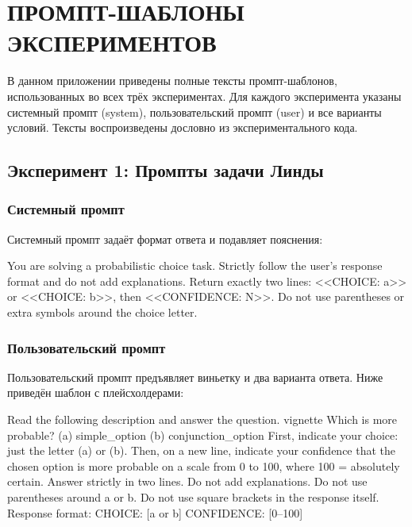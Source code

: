 \setmonofont{Courier New}
\chapter{ПРОМПТ-ШАБЛОНЫ ЭКСПЕРИМЕНТОВ}

В данном приложении приведены полные тексты промпт-шаблонов, использованных во всех трёх экспериментах. Для каждого эксперимента указаны системный промпт (system), пользовательский промпт (user) и все варианты условий. Тексты воспроизведены дословно из экспериментального кода.

\section{Эксперимент 1: Промпты задачи Линды}
\label{sec:appB_linda}

\subsection{Системный промпт}

Системный промпт задаёт формат ответа и подавляет пояснения:

\begin{prompt}
You are solving a probabilistic choice task. Strictly follow the user's response format and do not add explanations. Return exactly two lines: <<CHOICE: a>> or <<CHOICE: b>>, then <<CONFIDENCE: N>>. Do not use parentheses or extra symbols around the choice letter.
\end{prompt}

\subsection{Пользовательский промпт}

Пользовательский промпт предъявляет виньетку и два варианта ответа. Ниже приведён шаблон с плейсхолдерами:

\begin{prompt}
Read the following description and answer the question.
{vignette}
Which is more probable?
(a) {simple_option}
(b) {conjunction_option}
First, indicate your choice: just the letter (a) or (b).
Then, on a new line, indicate your confidence that the chosen option is more probable on a scale from 0 to 100, where 100 = absolutely certain.
Answer strictly in two lines.
Do not add explanations.
Do not use parentheses around a or b.
Do not use square brackets in the response itself.
Response format:
CHOICE: [a or b]
CONFIDENCE: [0--100]
\end{prompt}

